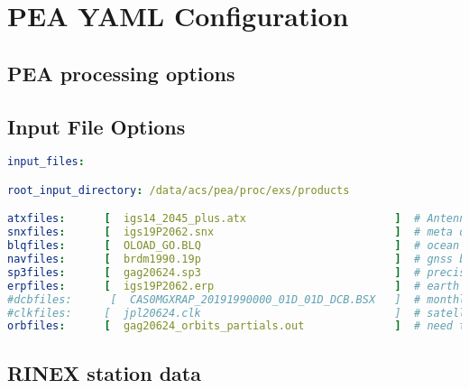 \chapter{PEA YAML Configuration}

\label{ch:pea_yaml_configuration}

\section{PEA processing options}
%
%
\section{Input File Options}
\begin{lstlisting}[language=yaml,caption=yaml input files configuration example]
input_files:

root_input_directory: /data/acs/pea/proc/exs/products

atxfiles:      [  igs14_2045_plus.atx                       ]  # Antenna models
snxfiles:      [  igs19P2062.snx                            ]  # meta data and apriori coords
blqfiles:      [  OLOAD_GO.BLQ                              ]  # ocean loading is applied
navfiles:      [  brdm1990.19p                              ]  # gnss broadcast file
sp3files:      [  gag20624.sp3                              ]  # precise orbit data 
erpfiles:      [  igs19P2062.erp                            ]  # earth orintation parameters
#dcbfiles:      [  CAS0MGXRAP_20191990000_01D_01D_DCB.BSX   ]  # monthly DCB file
#clkfiles:     [  jpl20624.clk                              ]  # satellie and receiver clock 
orbfiles:      [  gag20624_orbits_partials.out              ]  # need this when estimating orbits (overrides .sp3 file)
\end{lstlisting}

\section{RINEX station data}

